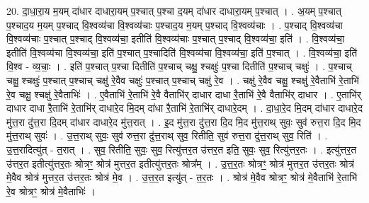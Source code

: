 \documentclass[17pt]{extarticle}
\begin{document}
20. दा॒धा॒रा॒य म॒यम् दा॑धार दाधारा॒यम् प॒श्चात् प॒श्चा द॒यम् दा॑धार दाधारा॒यम् प॒श्चात् । . अ॒यम् प॒श्चात् प॒श्चाद॒य म॒यम् प॒श्चाद् वि॒श्वव्य॑चा वि॒श्वव्य॑चाः प॒श्चाद॒य म॒यम् प॒श्चाद् वि॒श्वव्य॑चाः । . प॒श्चाद् वि॒श्वव्य॑चा वि॒श्वव्य॑चाः प॒श्चात् प॒श्चाद् वि॒श्वव्य॑चा॒ इतीति॑ वि॒श्वव्य॑चाः प॒श्चात् प॒श्चाद् वि॒श्वव्य॑चा॒ इति॑ । . वि॒श्वव्य॑चा॒ इतीति॑ वि॒श्वव्य॑चा वि॒श्वव्य॑चा॒ इति॑ प॒श्चात् प॒श्चादिति॑ वि॒श्वव्य॑चा वि॒श्वव्य॑चा॒ इति॑ प॒श्चात् । . वि॒श्वव्य॑चा॒ इति॑ वि॒श्व - व्य॒चाः॒ । . इति॑ प॒श्चात् प॒श्चा दितीति॑ प॒श्चाच् चक्षु॒ श्चक्षुः॑ प॒श्चा दितीति॑ प॒श्चाच् चक्षुः॑ । . प॒श्चाच् चक्षु॒ श्चक्षुः॑ प॒श्चात् प॒श्चाच् चक्षु॑ रे॒वैव चक्षुः॑ प॒श्चात् प॒श्चाच् चक्षु॑ रे॒व । . चक्षु॑ रे॒वैव चक्षु॒ श्चक्षु॑ रे॒वैताभि॑ रे॒ताभि॑ रे॒व चक्षु॒ श्चक्षु॑ रे॒वैताभिः॑ । . ए॒वैताभि॑ रे॒ताभि॑ रे॒वै वैताभि॑र् दाधार दाधा रै॒ताभि॑ रे॒वै वैताभि॑र् दाधार । . ए॒ताभि॑र् दाधार दाधा रै॒ताभि॑ रे॒ताभि॑र् दाधारे॒द मि॒दम् दा॑धा रै॒ताभि॑ रे॒ताभि॑र् दाधारे॒दम् । . दा॒धा॒रे॒द मि॒दम् दा॑धार दाधारे॒द मु॑त्त॒रा दु॑त्त॒रा दि॒दम् दा॑धार दाधारे॒द मु॑त्त॒रात् । . इ॒द मु॑त्त॒रा दु॑त्त॒रा दि॒द मि॒द मु॑त्त॒राथ् सुवः॒ सुव॑ रुत्त॒रा दि॒द मि॒द मु॑त्त॒राथ् सुवः॑ । . उ॒त्त॒राथ् सुवः॒ सुव॑ रुत्त॒रा दु॑त्त॒राथ् सुव॒ रितीति॒ सुव॑ रुत्त॒रा दु॑त्त॒राथ् सुव॒ रिति॑ । . उ॒त्त॒रादित्यु॑त् - त॒रात् । . सुव॒ रितीति॒ सुवः॒ सुव॒ रित्यु॑त्तर॒त उ॑त्तर॒त इति॒ सुवः॒ सुव॒ रित्यु॑त्तर॒तः । . इत्यु॑त्तर॒त उ॑त्तर॒त इतीत्यु॑त्तर॒तः श्रोत्रꣳ॒॒ श्रोत्र॑ मुत्तर॒त इतीत्यु॑त्तर॒तः श्रोत्र᳚म् । . उ॒त्त॒र॒तः श्रोत्रꣳ॒॒ श्रोत्र॑ मुत्तर॒त उ॑त्तर॒तः श्रोत्र॑ मे॒वैव श्रोत्र॑ मुत्तर॒त उ॑त्तर॒तः श्रोत्र॑ मे॒व । . उ॒त्त॒र॒त इत्यु॑त् - त॒र॒तः । . श्रोत्र॑ मे॒वैव श्रोत्रꣳ॒॒ श्रोत्र॑ मे॒वैताभि॑ रे॒ताभि॑ रे॒व श्रोत्रꣳ॒॒ श्रोत्र॑ मे॒वैताभिः॑ । \newline
\end{document}
